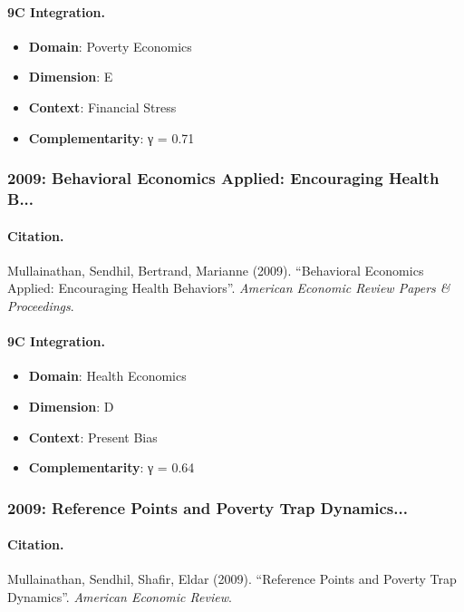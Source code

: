 \paragraph{9C Integration.}
\begin{itemize}[nosep]
  \item \textbf{Domain}: Poverty Economics
  \item \textbf{Dimension}: E
  \item \textbf{Context}: Financial Stress
  \item \textbf{Complementarity}: γ = 0.71
\end{itemize}


\subsubsection{2009: Behavioral Economics Applied: Encouraging Health B...}

\paragraph{Citation.}
Mullainathan, Sendhil, Bertrand, Marianne (2009). ``Behavioral Economics Applied: Encouraging Health Behaviors''. \textit{American Economic Review Papers & Proceedings}.

\paragraph{9C Integration.}
\begin{itemize}[nosep]
  \item \textbf{Domain}: Health Economics
  \item \textbf{Dimension}: D
  \item \textbf{Context}: Present Bias
  \item \textbf{Complementarity}: γ = 0.64
\end{itemize}


\subsubsection{2009: Reference Points and Poverty Trap Dynamics...}

\paragraph{Citation.}
Mullainathan, Sendhil, Shafir, Eldar (2009). ``Reference Points and Poverty Trap Dynamics''. \textit{American Economic Review}.

